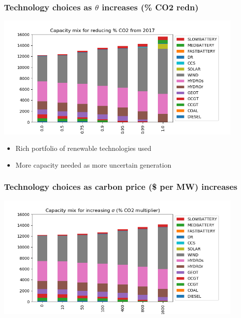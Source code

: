 \documentclass[xcolor=dvipsnames]{beamer}
\begin{document}
\begin{frame}
  \frametitle{Technology choices as $\theta$ increases (\% CO2 redn)}

  \includegraphics[width=4.8in]{includes/Sco2rednv20.png} \\
  \begin{itemize}
  \item Rich portfolio of renewable technologies used
  \item More capacity needed as more uncertain generation
  \end{itemize}
\end{frame}

\begin{frame}
  \frametitle{Technology choices as carbon price (\$ per MW) increases}

  \includegraphics[width=4.8in]{includes/Sco2incrv20.png}
\end{frame}
\end{document}
